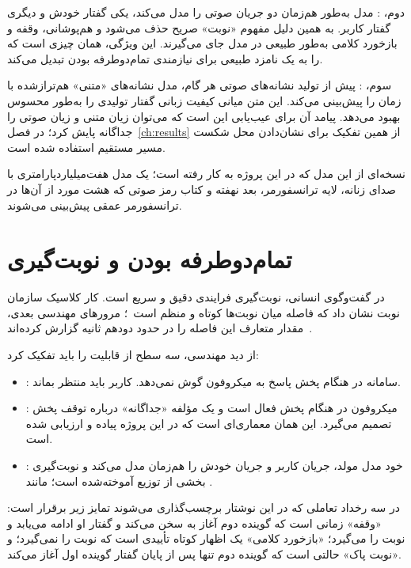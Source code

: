 دوم، : مدل به‌طور هم‌زمان دو جریان صوتی را مدل
می‌کند، یکی گفتار خودش و دیگری گفتار کاربر. به همین دلیل مفهوم «نوبت» صریح
حذف می‌شود و هم‌پوشانی، وقفه و بازخورد کلامی به‌طور طبیعی در مدل جای
می‌گیرند. این ویژگی، همان چیزی است که  را به یک نامزد طبیعی برای
نیازمندی تمام‌دوطرفه بودن تبدیل می‌کند.

سوم، : پیش از تولید نشانه‌های
صوتی هر گام، مدل نشانه‌های «متنی» هم‌تراز‌شده با زمان را پیش‌بینی
می‌کند. این متن میانی کیفیت زبانی گفتار تولیدی را به‌طور محسوس بهبود
می‌دهد. پیامد آن برای عیب‌یابی این است که می‌توان زیان متنی و زیان صوتی را
جداگانه پایش کرد؛ در فصل~\ref{ch:results} از همین تفکیک برای نشان‌دادن
محل شکست مسیر مستقیم استفاده شده است.

نسخه‌ای از این مدل که در این پروژه به کار رفته  است؛ یک مدل
هفت‌میلیارد‌پارامتری با صدای زنانه،  لایه ترانسفورمر، بعد نهفته
 و  کتاب رمز صوتی که هشت مورد از آن‌ها در ترانسفورمر عمقی
پیش‌بینی می‌شوند.

\section{تمام‌دوطرفه بودن و نوبت‌گیری}
\label{sec:duplex}

در گفت‌وگوی انسانی، نوبت‌گیری فرایندی دقیق و سریع است. کار کلاسیک
سازمان نوبت نشان داد که فاصله میان نوبت‌ها کوتاه و منظم است~\cite{sacks1974turntaking}؛
مرورهای مهندسی بعدی، مقدار متعارف این فاصله را در حدود دو‌دهم ثانیه
گزارش کرده‌اند~\cite{skantze2021turntaking}.

از دید مهندسی، سه سطح از قابلیت را باید تفکیک کرد:

\begin{itemize}
\item {}: سامانه در هنگام پخش پاسخ به میکروفون گوش نمی‌دهد.
      کاربر باید منتظر بماند.
\item {}: میکروفون در هنگام پخش فعال است و یک
      مؤلفه «جداگانه» درباره توقف پخش تصمیم می‌گیرد. این همان
      معماری‌ای است که در این پروژه پیاده و ارزیابی شده است.
\item {}: خود مدل مولد، جریان کاربر و جریان خودش را
      هم‌زمان مدل می‌کند و نوبت‌گیری بخشی از توزیع آموخته‌شده است؛ مانند
      .
\end{itemize}

در سه رخداد تعاملی که در این نوشتار برچسب‌گذاری می‌شوند تمایز زیر برقرار است:
«وقفه» زمانی است که گوینده دوم آغاز به سخن می‌کند و گفتار او ادامه
می‌یابد و نوبت را می‌گیرد؛ «بازخورد کلامی» یک اظهار کوتاه تأییدی است
که نوبت را نمی‌گیرد؛ و «نوبت پاک» حالتی است که گوینده دوم تنها پس از
پایان گفتار گوینده اول آغاز می‌کند.

